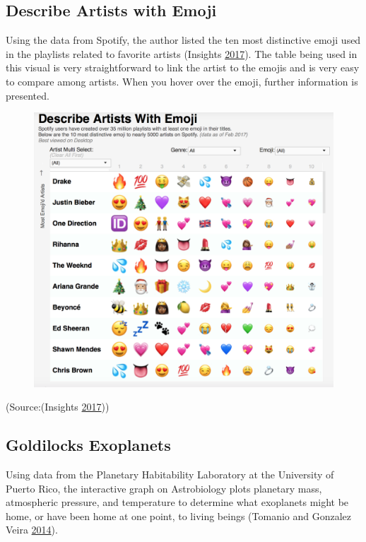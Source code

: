 \documentclass[]{book}
\theoremstyle{definition}
\theoremstyle{definition}
\theoremstyle{definition}
\theoremstyle{remark}
\begin{document}
\subsection{Describe Artists with
Emoji}\label{describe-artists-with-emoji}

Using the data from Spotify, the author listed the ten most distinctive
emoji used in the playlists related to favorite artists (Insights
\protect\hyperlink{ref-artist_emoji}{2017}). The table being used in
this visual is very straightforward to link the artist to the emojis and
is very easy to compare among artists. When you hover over the emoji,
further information is presented.

\begin{figure}
\centering
\includegraphics{images/artist_emoji.png}
\caption{}
\end{figure}

(Source:(Insights \protect\hyperlink{ref-artist_emoji}{2017}))

\subsection{Goldilocks Exoplanets}\label{goldilocks-exoplanets}

Using data from the Planetary Habitability Laboratory at the University
of Puerto Rico, the interactive graph on Astrobiology plots planetary
mass, atmospheric pressure, and temperature to determine what exoplanets
might be home, or have been home at one point, to living beings (Tomanio
and Gonzalez Veira \protect\hyperlink{ref-goldilocks_worlds}{2014}).
\end{document}
